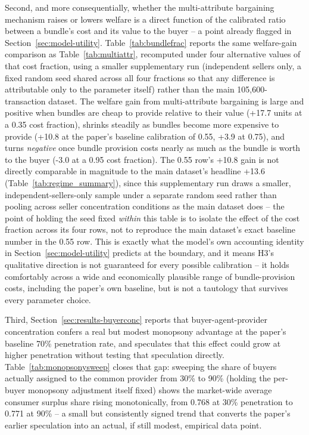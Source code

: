 \documentclass[review]{elsarticle}
\begin{document}
Second, and more consequentially, whether the multi-attribute bargaining mechanism raises or lowers welfare is a direct function of the calibrated ratio between a bundle's cost and its value to the buyer -- a point already flagged in Section~\ref{sec:model-utility}. Table~\ref{tab:bundlefrac} reports the same welfare-gain comparison as Table~\ref{tab:multiattr}, recomputed under four alternative values of that cost fraction, using a smaller supplementary run (independent sellers only, a fixed random seed shared across all four fractions so that any difference is attributable only to the parameter itself) rather than the main 105,600-transaction dataset. The welfare gain from multi-attribute bargaining is large and positive when bundles are cheap to provide relative to their value (+17.7 units at a 0.35 cost fraction), shrinks steadily as bundles become more expensive to provide (+10.8 at the paper's baseline calibration of 0.55, +3.9 at 0.75), and turns \emph{negative} once bundle provision costs nearly as much as the bundle is worth to the buyer (-3.0 at a 0.95 cost fraction). The 0.55 row's +10.8 gain is not directly comparable in magnitude to the main dataset's headline +13.6 (Table~\ref{tab:regime_summary}), since this supplementary run draws a smaller, independent-sellers-only sample under a separate random seed rather than pooling across seller concentration conditions as the main dataset does -- the point of holding the seed fixed \emph{within} this table is to isolate the effect of the cost fraction across its four rows, not to reproduce the main dataset's exact baseline number in the 0.55 row. This is exactly what the model's own accounting identity in Section~\ref{sec:model-utility} predicts at the boundary, and it means H3's qualitative direction is not guaranteed for every possible calibration -- it holds comfortably across a wide and economically plausible range of bundle-provision costs, including the paper's own baseline, but is not a tautology that survives every parameter choice.

Third, Section~\ref{sec:results-buyerconc} reports that buyer-agent-provider concentration confers a real but modest monopsony advantage at the paper's baseline 70\% penetration rate, and speculates that this effect could grow at higher penetration without testing that speculation directly. Table~\ref{tab:monopsonysweep} closes that gap: sweeping the share of buyers actually assigned to the common provider from 30\% to 90\% (holding the per-buyer monopsony adjustment itself fixed) shows the market-wide average consumer surplus share rising monotonically, from 0.768 at 30\% penetration to 0.771 at 90\% -- a small but consistently signed trend that converts the paper's earlier speculation into an actual, if still modest, empirical data point.
\end{document}
